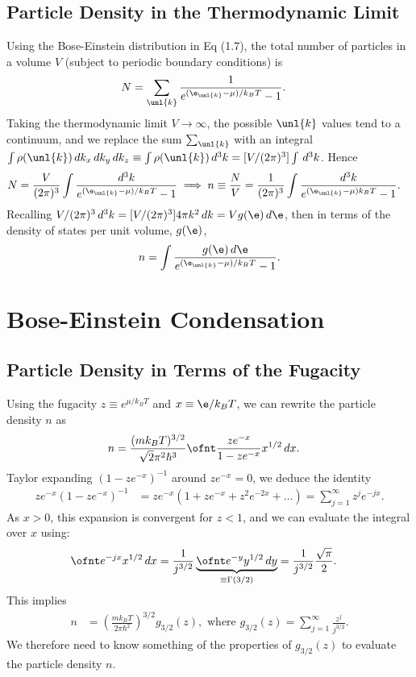 \documentclass[qo.tex]{subfiles}
\begin{document}
\section{Particle Density in the Thermodynamic Limit}
Using the Bose-Einstein distribution in Eq (1.7), the total number of particles in a volume $V$ (subject to periodic boundary conditions) is
\begin{align}
    N &= \sum_{\unl{k}}\frac{1}{e^{(\e_{\unl{k}}-\mu)/k_BT}-1}.
\end{align}
Taking the thermodynamic limit $V\to\infty$, the possible $\unl{k}$ values tend to a continuum, and we replace the sum $\sum_{\unl{k}}$ with an integral $\int\rho(\unl{k})\,dk_x\,dk_y\,dk_z \equiv \int\rho(\unl{k})\,d^3k = [V/(2\pi)^3]\int\,d^3k$.
Hence
\begin{align}
    N &= \frac{V}{(2\pi)^3}\int \frac{d^3k}{e^{(\e_{\unl{k}}-\mu)/k_BT}-1} \implies n \equiv \frac{N}{V} = \frac{1}{(2\pi)^3}\int \frac{d^3k}{e^{(\e_{\unl{k}}-\mu)k_BT}-1}.
\end{align}
Recalling $V/(2\pi)^3\,d^3k = [V/(2\pi)^3]4\pi k^2\,dk = Vg(\e)\,d\e$, then in terms of the density of states per unit volume, $g(\e)$,
\begin{align}
    n = \int \frac{g(\e)\,d\e}{e^{(\e_{\unl{k}}-\mu)/k_BT}-1}.
\end{align}

\chapter{Bose-Einstein Condensation}
\section{Particle Density in Terms of the Fugacity}
Using the fugacity $z\equiv e^{\mu/k_BT}$ and $x\equiv \e/k_BT$, we can rewrite the particle density $n$ as
\begin{align}
    n &= \frac{(mk_BT)^{3/2}}{\sqrt{2}\pi^2\hbar^3}\ofnt \frac{ze^{-x}}{1-ze^{-x}}x^{1/2}\,dx.
\end{align}
Taylor expanding $(1-ze^{-x})^{-1}$ around $ze^{-x}=0$, we deduce the identity
\begin{align}
    ze^{-x}(1-ze^{-x})^{-1} &= ze^{-x}\left(1+ze^{-x}+z^2e^{-2x} + \dots\right) = \sum_{j=1}^\infty z^je^{-jx}.
\end{align}
As $x>0$, this expansion is convergent for $z<1$, and we can evaluate the integral over $x$ using:
\begin{align}
    \ofnt e^{-jx}x^{1/2}\,dx &= \frac{1}{j^{3/2}}\underbrace{\ofnt e^{-y}y^{1/2}\,dy}_{\equiv \Gamma(3/2)} = \frac{1}{j^{3/2}}\frac{\sqrt{\pi}}{2}.
\end{align}
This implies 
\begin{align}
    n &= \left(\frac{mk_BT}{2\pi\hbar^2}\right)^{3/2}g_{3/2}(z), \text{ where } g_{3/2}(z) = \sum_{j=1}^\infty \frac{z^j}{j^{3/2}}.
\end{align}
We therefore need to know something of the properties of $g_{3/2}(z)$ to evaluate the particle density $n$.
\end{document}
